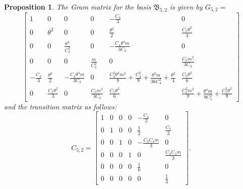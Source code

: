 \documentclass[table]{amsart}
\newtheorem{proposition}[theorem]{Proposition}
\numberwithin{equation}{section}
\begin{document}
\begin{proposition}
    The Gram matrix for the basis $\mathfrak{B}_{5, 2}$ is given by $G_{5,2}=$
    \[
\begin{bmatrix}
1
& 0
& 0
& 0
& -\tfrac{C_4}{3}
& 0 \\[8pt]

0
& \theta^2
& 0
& 0
& \tfrac{\theta^2}{2 }
& \tfrac{C_5 \theta^2}{3 } \\[8pt]

0
& 0
& \tfrac{\theta^4}{C_2^2}
& 0
& -\tfrac{C_4 \theta^4 m}{3 C_2}
& 0 \\[8pt]

0
& 0
& 0
& \tfrac{m}{C_3^2}
& 0
& \tfrac{C_5 m^2}{3 C_3} \\[8pt]

-\tfrac{C_4}{3}
& \tfrac{\theta^2}{2 }
& -\tfrac{C_4 \theta^4 m}{3 C_2}
& 0
& \tfrac{C_4^2 \theta^4 m^2}{9}
  + \tfrac{C_4^2}{9}
  + \tfrac{\theta^2 m}{36 C_4^2}
  + \tfrac{\theta^2}{4 }
& \tfrac{C_5 \theta^2}{6 } \\[8pt]

0
& \tfrac{C_5 \theta^2}{3 }
& 0
& \tfrac{C_5 m^2}{3 C_3}
& \tfrac{C_5 \theta^2}{6 }
& \tfrac{C_5^2 m^3}{9}
  + \tfrac{\theta^4 m}{9 C_5^2}
  + \tfrac{C_5^2 \theta^2}{9 }
\end{bmatrix}
\] 
and the transition matrix  as follows:
\[C_{5,2}=
\begin{bmatrix}
1 & 0 & 0 & 0 & -\tfrac{C_4}{3} & 0 \\[8pt]
0 & 1 & 0 & 0 & \frac{1}{2} & \frac{C_5}{3} \\[8pt]
0 & 0 & 1 & 0 & -\frac{C_2 C_4 m}{3} & 0 \\[8pt]
0 & 0 & 0 & 1 & 0 & \frac{C_3 C_5 m}{3} \\[8pt]
0 & 0 & 0 & 0 & \frac{1}{6} & 0 \\[8pt]
0 & 0 & 0 & 0 & 0 & \frac{1}{3}
\end{bmatrix}.
\]
\end{proposition}
\end{document}

